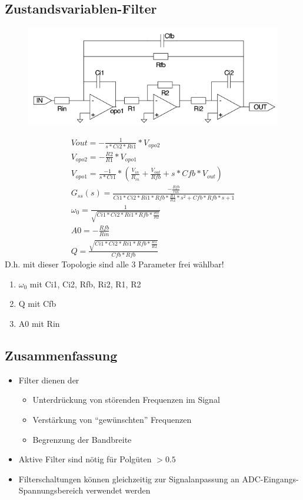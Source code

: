 \subsection{Zustandsvariablen-Filter}
\begin{figure}[!h]
\centering
 \includegraphics[scale=0.5]{pictures/zustandsvariable}
\end{figure}
\begin{gather}
V{out}=-\frac{1}{s*Ci2*Ri1}*V_{opo2}\\
V_{opo2}=-\frac{R2}{R1}*V_{opo1}\\
V_{opo1}=\frac{-1}{s*Ci1}*(\frac{V_{in}}{R_{in}}+\frac{V_{out}}{Rfb}+s*Cfb*V_{out})\\
G_{ss}(s)=\frac{-\frac{Rfb}{rin}}{Ci1*Ci2*Ri1*Rfb*\frac{R1}{R2}*s^2+Cfb*Rfb*s+1}\\
\omega_{0}=\frac{1}{\sqrt{Ci1*Ci2*Ri1*Rfb*\frac{R1}{R2}}}\\
A0=-\frac{Rfb}{Rin}\\
Q=\frac{\sqrt{Ci1*Ci2*Ri1*Rfb*\frac{R1}{R2}}}{Cfb*Rfb}
\end{gather}
D.h. mit dieser Topologie sind alle 3 Parameter frei wählbar!
\begin{enumerate}
  \item $\omega_{0}$ mit Ci1, Ci2, Rfb, Ri2, R1, R2
  \item Q mit Cfb
  \item A0 mit Rin
\end{enumerate}

\subsection{Zusammenfassung}
\begin{itemize}
  \item Filter dienen der
  \begin{itemize}
    \item Unterdrückung von störenden Frequenzen im Signal
    \item Verstärkung von "`gewünschten"' Frequenzen
    \item Begrenzung der Bandbreite
   \end{itemize}
   \item Aktive Filter sind nötig für Polgüten $>0.5$
   \item Filterschaltungen können gleichzeitig zur Signalanpassung an
   ADC-Eingangs-Spannungsbereich verwendet werden
\end{itemize}


